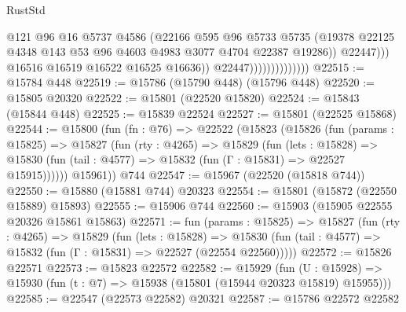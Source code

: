 \begin{lexlean}{RustStd}
\begin{coremodule}
                                          @121
                                          @96
                                          @16
                                          @5737
                                          @4586
                                          (@22166
                                            @595
                                            @96
                                            @5733
                                            @5735
                                            (@19378
                                              @22125
                                              @4348
                                              @143
                                              @53
                                              @96
                                              @4603
                                              @4983
                                              @3077
                                              @4704
                                              @22387
                                              @19286))
                                          @22447)))
                                    @16516
                                    @16519
                                    @16522
                                    @16525
                                    @16636))
                                @22447))))))))))))))
@22515 := @15784 @448
@22519 := @15786 (@15790 @448) (@15796 @448)
@22520 := @15805 @20320
@22522 := @15801 (@22520 @15820)
@22524 := @15843 (@15844 @448)
@22525 := @15839 @22524
@22527 := @15801 (@22525 @15868)
@22544 := @15800
    (fun (fn : @76) =>
    @22522
      (@15823
        (@15826
          (fun (params : @15825) =>
          @15827
            (fun (rty : @4265) =>
            @15829
              (fun (lets : @15828) =>
              @15830 (fun (tail : @4577) => @15832 (fun (Γ : @15831) => @22527 @15915))))))
        @15961))
    @744
@22547 := @15967 (@22520 (@15818 @744))
@22550 := @15880 (@15881 @744) @20323
@22554 := @15801 (@15872 (@22550 @15889) @15893)
@22555 := @15906 @744
@22560 := @15903 (@15905 @22555 @20326 @15861 @15863)
@22571 := fun (params : @15825) =>
  @15827
    (fun (rty : @4265) =>
    @15829
      (fun (lets : @15828) =>
      @15830 (fun (tail : @4577) => @15832 (fun (Γ : @15831) => @22527 (@22554 @22560)))))
@22572 := @15826 @22571
@22573 := @15823 @22572
@22582 := @15929
    (fun (U : @15928) => @15930 (fun (t : @7) => @15938 (@15801 (@15944 @20323 @15819) @15955)))
@22585 := @22547 (@22573 @22582) @20321
@22587 := @15786 @22572 @22582

\end{coremodule}
\end{lexlean}
